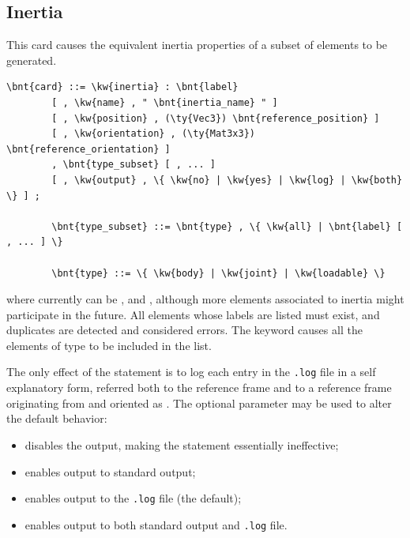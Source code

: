 \subsection{Inertia}\label{sec:EL:MISC:INERTIA}
This card causes the equivalent inertia properties of a subset
of elements to be generated.
\begin{Verbatim}[commandchars=\\\{\}]
    \bnt{card} ::= \kw{inertia} : \bnt{label}
        [ , \kw{name} , " \bnt{inertia_name} " ]
        [ , \kw{position} , (\ty{Vec3}) \bnt{reference_position} ]
        [ , \kw{orientation} , (\ty{Mat3x3}) \bnt{reference_orientation} ]
        , \bnt{type_subset} [ , ... ]
        [ , \kw{output} , \{ \kw{no} | \kw{yes} | \kw{log} | \kw{both} \} ] ;

        \bnt{type_subset} ::= \bnt{type} , \{ \kw{all} | \bnt{label} [ , ... ] \}

        \bnt{type} ::= \{ \kw{body} | \kw{joint} | \kw{loadable} \}
\end{Verbatim}
where  currently can be ,  and , 
although more elements associated to inertia might participate in the future.
All elements whose labels are listed must exist, and duplicates
are detected and considered errors.
The keyword  causes all the elements of type  
to be included in the list.

\noindent
The only effect of the  statement is to log
each  entry in the \texttt{.log} file in a self explanatory form,
referred both to the  reference frame and to a reference frame
originating from  and oriented 
as .
The optional parameter  may be used to alter the default 
behavior:
\begin{itemize}
\item {} disables the output, making the  
statement essentially ineffective;
\item {} enables output to standard output;
\item {} enables output to the \texttt{.log} file (the default);
\item {} enables output to both standard output and \texttt{.log} file.
\end{itemize}



